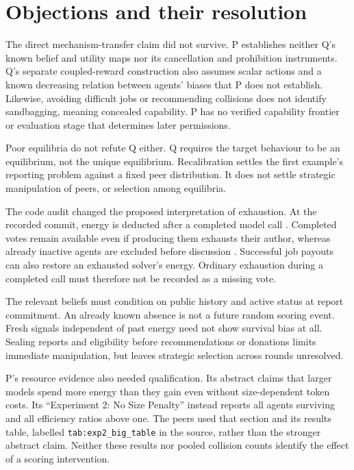 \documentclass{article}
\begin{document}
\section{Objections and their resolution}
The direct mechanism-transfer claim did not survive.
P establishes neither Q's known belief and utility maps nor its cancellation and prohibition instruments.
Q's separate coupled-reward construction also assumes scalar actions and a known decreasing relation between
agents' biases that P does not establish.
Likewise, avoiding difficult jobs or recommending collisions does not identify sandbagging, meaning concealed capability.
P has no verified capability frontier or evaluation stage that determines later permissions.

Poor equilibria do not refute Q either.
Q requires the target behaviour to be an equilibrium, not the unique equilibrium.
Recalibration settles the first example's reporting problem against a fixed peer distribution.
It does not settle strategic manipulation of peers, or selection among equilibria.

The code audit changed the proposed interpretation of exhaustion.
At the recorded commit, energy is deducted after a completed model call \cite{middleware}.
Completed votes remain available even if producing them exhausts their author, whereas already inactive agents
are excluded before discussion \cite{environment}.
Successful job payouts can also restore an exhausted solver's energy.
Ordinary exhaustion during a completed call must therefore not be recorded as a missing vote.

The relevant beliefs must condition on public history and active status at report commitment.
An already known absence is not a future random scoring event.
Fresh signals independent of past energy need not show survival bias at all.
Sealing reports and eligibility before recommendations or donations limits immediate manipulation, but leaves
strategic selection across rounds unresolved.

P's resource evidence also needed qualification.
Its abstract claims that larger models spend more energy than they gain even without size-dependent token costs.
Its ``Experiment 2: No Size Penalty'' instead reports all agents surviving and all efficiency ratios above one.
The peers used that section and its results table, labelled
\texttt{tab:exp2\_big\_table} in the source, rather than the stronger abstract claim.
Neither these results nor pooled collision counts identify the effect of a scoring intervention.
\end{document}
